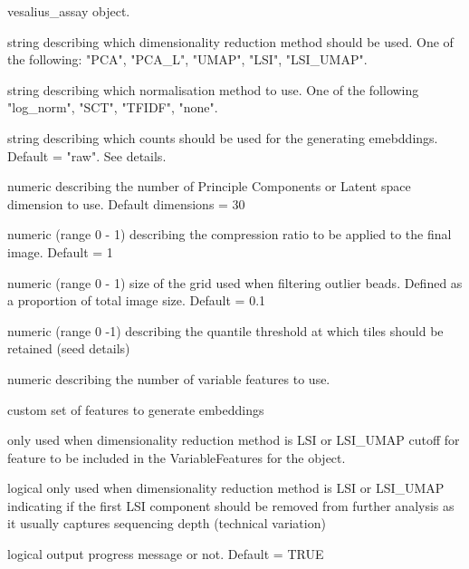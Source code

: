 \documentclass[a4paper]{book}
\begin{document}
%
\begin{Arguments}
\begin{ldescription}
\item[\code{vesalius\_assay}] vesalius\_assay object.

\item[\code{dim\_reduction}] string describing which dimensionality
reduction method should be used. One of the following:
"PCA", "PCA\_L", "UMAP", "LSI", "LSI\_UMAP".

\item[\code{normalization}] string describing which normalisation 
method to use. One of the following "log\_norm", "SCT", "TFIDF", "none".

\item[\code{use\_counts}] string describing which counts should be used for the 
generating emebddings. Default = "raw". See details.

\item[\code{dimensions}] numeric describing the number of Principle Components or
Latent space dimension to use. Default dimensions = 30

\item[\code{tensor\_resolution}] numeric (range 0 - 1) describing the compression
ratio to be applied to the final image. Default = 1

\item[\code{filter\_grid}] numeric (range 0 - 1) size of the grid used when filtering
outlier beads. Defined as a proportion of total image size. Default = 0.1

\item[\code{filter\_threshold}] numeric (range 0 -1) describing the quantile
threshold at which tiles should be retained (seed details)

\item[\code{nfeatures}] numeric describing the number of variable features to use.

\item[\code{features}] custom set of features to generate embeddings

\item[\code{min\_cutoff}] only used when dimensionality reduction method is
LSI or LSI\_UMAP
cutoff for feature to be included in the VariableFeatures for the object.

\item[\code{remove\_lsi\_1}] logical only used when dimensionality reduction
method is LSI or LSI\_UMAP
indicating if the first LSI component should be removed from further analysis
as it usually captures sequencing depth (technical variation)

\item[\code{verbose}] logical output progress message or not. Default = TRUE
\end{ldescription}
\end{Arguments}
\end{document}

